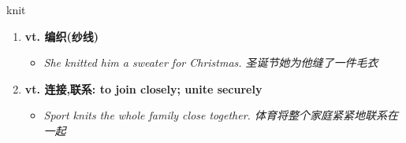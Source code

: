 
\begin{frame}
{\huge knit}
\begin{center}
\begin{enumerate}\Large
  \item \textbf{vt. 编织(纱线)}
  \begin{itemize}
    \item \em{\Large{She knitted him a sweater for Christmas. 圣诞节她为他缝了一件毛衣}}
  \end{itemize}
  \item \textbf{vt. 连接,联系: to join closely; unite securely}
  \begin{itemize}
    \item \em{\Large{Sport knits the whole family close together. 体育将整个家庭紧紧地联系在一起}}
  \end{itemize}
\end{enumerate}
\end{center}
\end{frame}

